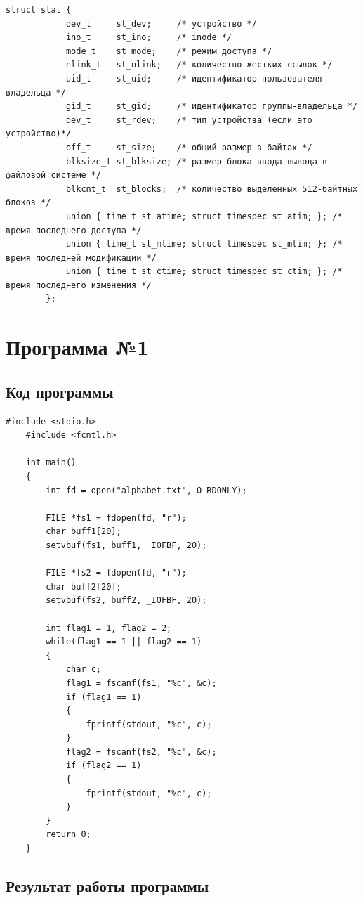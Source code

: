 	\begin{lstlisting}[caption={struct stat}, label={code:stat}]
		struct stat {
			dev_t     st_dev;     /* устройство */
			ino_t     st_ino;     /* inode */
			mode_t    st_mode;    /* режим доступа */
			nlink_t   st_nlink;   /* количество жестких ссылок */
			uid_t     st_uid;     /* идентификатор пользователя-владельца */
			gid_t     st_gid;     /* идентификатор группы-владельца */
			dev_t     st_rdev;    /* тип устройства (если это устройство)*/
			off_t     st_size;    /* общий размер в байтах */
			blksize_t st_blksize; /* размер блока ввода-вывода в файловой системе */
			blkcnt_t  st_blocks;  /* количество выделенных 512-байтных блоков */
			union { time_t st_atime; struct timespec st_atim; }; /* время последнего доступа */
			union { time_t st_mtime; struct timespec st_mtim; }; /* время последней модификации */
			union { time_t st_ctime; struct timespec st_ctim; }; /* время последнего изменения */
		};
	\end{lstlisting}
	
	\newpage
	\chapter{Программа №1}
	
	\section{Код программы}
	
	\begin{lstlisting}[caption={Код первой программы}, label={code:p1}]
	#include <stdio.h>
	#include <fcntl.h>
	
	int main()
	{
		int fd = open("alphabet.txt", O_RDONLY);
		
		FILE *fs1 = fdopen(fd, "r");
		char buff1[20];
		setvbuf(fs1, buff1, _IOFBF, 20);
		
		FILE *fs2 = fdopen(fd, "r");
		char buff2[20];
		setvbuf(fs2, buff2, _IOFBF, 20);
		
		int flag1 = 1, flag2 = 2;
		while(flag1 == 1 || flag2 == 1)
		{
			char c;
			flag1 = fscanf(fs1, "%c", &c);
			if (flag1 == 1) 
			{
				fprintf(stdout, "%c", c);
			}
			flag2 = fscanf(fs2, "%c", &c);
			if (flag2 == 1)
			{ 
				fprintf(stdout, "%c", c); 
			}
		}
		return 0;
	}
	\end{lstlisting}
	
	\section{Результат работы программы}
	
